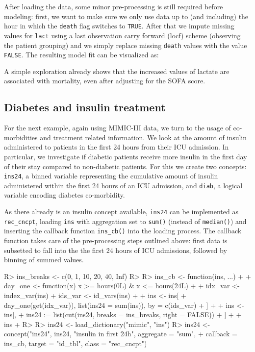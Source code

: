 \documentclass[
]{jss}
\begin{document}
After loading the data, some minor pre-processing is still required
before modeling: first, we want to make sure we only use data up to (and
including) the hour in which the \texttt{death} flag switches to
\texttt{TRUE}. After that we impute missing values for \texttt{lact}
using a last observation carry forward (locf) scheme (observing the
patient grouping) and we simply replace missing \texttt{death} values
with the value \texttt{FALSE}. The resulting model fit can be visualized
as:

A simple exploration already shows that the increased values of lactate
are associated with mortality, even after adjusting for the SOFA score.

\hypertarget{diabetes-and-insulin-treatment}{%
\subsection{Diabetes and insulin
treatment}\label{diabetes-and-insulin-treatment}}

For the next example, again using MIMIC-III data, we turn to the usage
of co-morbidities and treatment related information. We look at the
amount of insulin administered to patients in the first 24 hours from
their ICU admission. In particular, we investigate if diabetic patients
receive more insulin in the first day of their stay compared to
non-diabetic patients. For this we create two concepts: \texttt{ins24},
a binned variable representing the cumulative amount of insulin
administered within the first 24 hours of an ICU admission, and
\texttt{diab}, a logical variable encoding diabetes co-morbidity.

As there already is an insulin concept available, \texttt{ins24} can be
implemented as \texttt{rec\_cncpt}, loading \texttt{ins} with
aggregation set to \texttt{sum()} (instead of \texttt{median()}) and
inserting the callback function \texttt{ins\_cb()} into the loading
process. The callback function takes care of the pre-processing steps
outlined above: first data is subsetted to fall into the the first 24
hours of ICU admissions, followed by binning of summed values.

\begin{CodeChunk}
\begin{CodeInput}
R> ins_breaks <- c(0, 1, 10, 20, 40, Inf)
R> 
R> ins_cb <- function(ins, ...) {
+ 
+   day_one <- function(x) x >= hours(0L) & x <= hours(24L)
+ 
+   idx_var <- index_var(ins)
+   ids_var <- id_vars(ins)
+ 
+   ins <- ins[
+     day_one(get(idx_var)), list(ins24 = sum(ins)), by = c(ids_var)
+   ]
+ 
+   ins <- ins[,
+     ins24 := list(cut(ins24, breaks = ins_breaks, right = FALSE))
+   ]
+ 
+   ins
+ }
R> 
R> ins24 <- load_dictionary("mimic", "ins")
R> ins24 <- concept("ins24", ins24, "insulin in first 24h", aggregate = "sum",
+                  callback = ins_cb, target = "id_tbl", class = "rec_cncpt")
\end{CodeInput}
\end{CodeChunk}
\end{document}
